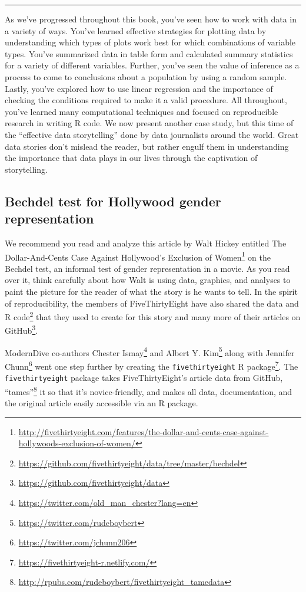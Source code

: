 \documentclass[12pt,]{krantz}
\renewcommand{\href}[2]{#2\footnote{\url{#1}}}
\theoremstyle{definition}
\theoremstyle{definition}
\theoremstyle{definition}
\theoremstyle{remark}
\begin{document}
\begin{center}\rule{0.5\linewidth}{\linethickness}\end{center}

As we've progressed throughout this book, you've seen how to work with
data in a variety of ways. You've learned effective strategies for
plotting data by understanding which types of plots work best for which
combinations of variable types. You've summarized data in table form and
calculated summary statistics for a variety of different variables.
Further, you've seen the value of inference as a process to come to
conclusions about a population by using a random sample. Lastly, you've
explored how to use linear regression and the importance of checking the
conditions required to make it a valid procedure. All throughout, you've
learned many computational techniques and focused on reproducible
research in writing R code. We now present another case study, but this
time of the ``effective data storytelling'' done by data journalists
around the world. Great data stories don't mislead the reader, but
rather engulf them in understanding the importance that data plays in
our lives through the captivation of storytelling.

\subsection{Bechdel test for Hollywood gender
representation}\label{bechdel-test-for-hollywood-gender-representation}

We recommend you read and analyze this article by Walt Hickey entitled
\href{http://fivethirtyeight.com/features/the-dollar-and-cents-case-against-hollywoods-exclusion-of-women/}{The
Dollar-And-Cents Case Against Hollywood's Exclusion of Women} on the
Bechdel test, an informal test of gender representation in a movie. As
you read over it, think carefully about how Walt is using data,
graphics, and analyses to paint the picture for the reader of what the
story is he wants to tell. In the spirit of reproducibility, the members
of FiveThirtyEight have also shared the
\href{https://github.com/fivethirtyeight/data/tree/master/bechdel}{data
and R code} that they used to create for this story and many more of
their articles on
\href{https://github.com/fivethirtyeight/data}{GitHub}.

ModernDive co-authors
\href{https://twitter.com/old_man_chester?lang=en}{Chester Ismay} and
\href{https://twitter.com/rudeboybert}{Albert Y. Kim} along with
\href{https://twitter.com/jchunn206}{Jennifer Chunn} went one step
further by creating the
\href{https://fivethirtyeight-r.netlify.com/}{\texttt{fivethirtyeight} R
package}. The \texttt{fivethirtyeight} package takes FiveThirtyEight's
article data from GitHub,
\href{http://rpubs.com/rudeboybert/fivethirtyeight_tamedata}{``tames''}
it so that it's novice-friendly, and makes all data, documentation, and
the original article easily accessible via an R package.
\end{document}
